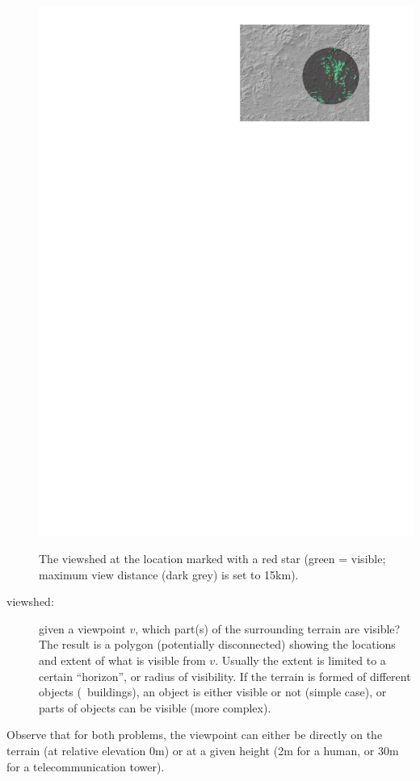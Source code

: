 \begin{description}
\begin{marginfigure}
    \includegraphics[width=\linewidth]{figs/overview_viewshed}
    \caption{The viewshed at the location marked with a red star (green = visible; maximum view distance (dark grey) is set to 15km).}%
  \end{marginfigure} 
  \item[viewshed:] given a viewpoint $v$, which part(s) of the surrounding terrain are visible? The result is a polygon (potentially disconnected) showing the locations and extent of what is visible from $v$. Usually the extent is limited to a certain ``horizon'', or radius of visibility. If the terrain is formed of different objects (\eg\ buildings), an object is either visible or not (simple case), or parts of objects can be visible (more complex).
\end{description}
Observe that for both problems, the viewpoint can either be directly on the terrain (at relative elevation 0m) or at a given height (2m for a human, or 30m for a telecommunication tower).

